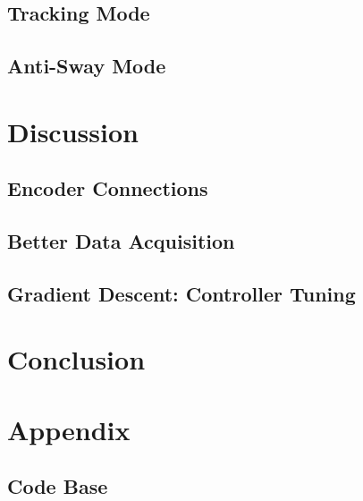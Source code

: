 \documentclass[letterpaper]{article}
\begin{document}
\subsection{Tracking Mode}
\subsection{Anti-Sway Mode}

\newpage

\section{Discussion}
\subsection{Encoder Connections}
\subsection{Better Data Acquisition}
\subsection{Gradient Descent: Controller Tuning}

\newpage

\section{Conclusion}

\newpage

\section{Appendix}
\subsection{Code Base}
\end{document}
